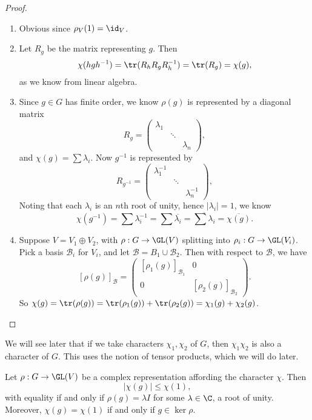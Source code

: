 \documentclass[a4paper]{article}
\begin{document}
\begin{proof}\leavevmode
  \begin{enumerate}
    \item Obvious since $\rho_V(1) = \id_V$.
    \item Let $R_g$ be the matrix representing $g$. Then
      \[
        \chi(hgh^{-1}) = \tr(R_h R_g R_h^{-1}) = \tr(R_g) = \chi(g),
      \]
      as we know from linear algebra.
    \item Since $g \in G$ has finite order, we know $\rho(g)$ is represented by a diagonal matrix
      \[
        R_g =
        \begin{pmatrix}
          \lambda_1\\
          & \ddots\\
          && \lambda_n
        \end{pmatrix},
      \]
      and $\chi(g) = \sum \lambda_i$. Now $g^{-1}$ is represented by
      \[
        R_{g^{-1}} =
        \begin{pmatrix}
          \lambda_1^{-1}\\
          & \ddots\\
          && \lambda_n^{-1}
        \end{pmatrix},
      \]
      Noting that each $\lambda_i$ is an $n$th root of unity, hence $|\lambda_i| = 1$, we know
      \[
        \chi(g^{-1}) = \sum \lambda_i^{-1} = \sum \overline{\lambda_i} = \overline{\sum \lambda_i} = \overline{\chi(g)}.
      \]
    \item Suppose $V = V_1 \oplus V_2$, with $\rho: G \to \GL(V)$ splitting into $\rho_i: G \to \GL(V_i)$. Pick a basis $\mathcal{B}_i$ for $V_i$, and let $\mathcal{B} = B_1 \cup \mathcal{B}_2$. Then with respect to $\mathcal{B}$, we have
      \[
        [\rho(g)]_{\mathcal{B}} =
        \begin{pmatrix}
          [\rho_1(g)]_{\mathcal{B}_1} & 0\\
          0 & [\rho_2(g)]_{\mathcal{B}_2}
        \end{pmatrix}.
      \]
      So $\chi(g) = \tr(\rho(g)) = \tr(\rho_1(g)) + \tr(\rho_2(g)) = \chi_1(g) + \chi_2(g)$.
  \end{enumerate}
\end{proof}
We will see later that if we take characters $\chi_1, \chi_2$ of $G$, then $\chi_1 \chi_2$ is also a character of $G$. This uses the notion of tensor products, which we will do later.

\begin{lemma}
  Let $\rho: G \to \GL(V)$ be a complex representation affording the character $\chi$. Then
  \[
    |\chi(g)| \leq \chi(1),
  \]
  with equality if and only if $\rho(g) = \lambda I$ for some $\lambda \in \C$, a root of unity. Moreover, $\chi(g) = \chi(1)$ if and only if $g \in \ker \rho$.
\end{lemma}
\end{document}
